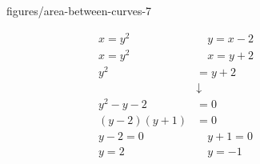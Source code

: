 \documentclass{book}
\begin{document}

\begin{figure}[ht]
    \centering
    \caption{figures/area-between-curves-7}
    \label{fig:area-between-curves-7}
\end{figure}

\begin{align*}
    x=y^2 \quad & \quad y=x-2\\
    x=y^2 \quad & \quad x=y+2\\
    y^2&= y+2 \\
       &\downarrow \\
    y^2-y-2&= 0 \\
    (y-2)(y+1)&= 0 \\
    y-2=0 \quad & \quad y+1=0 \\
    y=2 \quad & \quad y=-1 \\
\end{align*}
\end{document}

